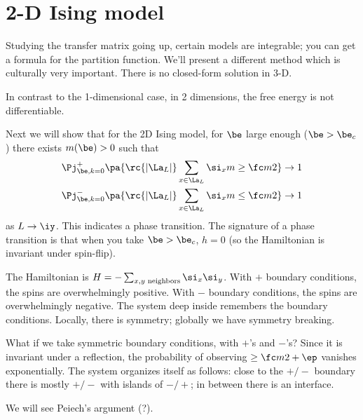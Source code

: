 \section{2-D Ising model}

Studying the transfer matrix going up, certain models are integrable; you can get a formula for the partition function. We'll present a different method which is culturally very important.
There is no closed-form solution in 3-D.

In contrast to the 1-dimensional case, in 2 dimensions, the free energy is not differentiable. 

Next we will show that for the 2D Ising model, for $\be$ large enough ($\be>\be_c$) there exists $m(\be)>0$ such that 
\begin{align}
\Pj_{\be,k=0}^+\pa{\rc{|\La_L|}\sum_{x\in \La_L} \si_x m\ge\fc m2}&\to 1\\
\Pj_{\be,k=0}^-\pa{\rc{|\La_L|}\sum_{x\in \La_L} \si_x m\le \fc m2}&\to 1
\end{align}
as $L\to \iy$. This indicates a phase transition. 
The signature of a phase transition is that when you take $\be>\be_c$, $h=0$ (so the Hamiltonian is invariant under spin-flip).

The Hamiltonian is $H=-\sum_{x,y\text{ neighbors}} \si_x\si_y$.
With $+$ boundary conditions, the spins are overwhelmingly positive. With $-$ boundary conditions, the spins are overwhelmingly negative. The system deep inside remembers the boundary conditions. 
Locally, there is symmetry; globally we have symmetry breaking.

What if we take symmetric boundary conditions, with $+$'s and $-$'s? Since it is invariant under a reflection, the probability of observing $\ge \fc m2+\ep$ vanishes exponentially. The system organizes itself as follows: close to the $+/-$ boundary there is mostly $+/-$ with islands of $-/+$; in between there is an interface.


We will see Peiech's argument (?).
